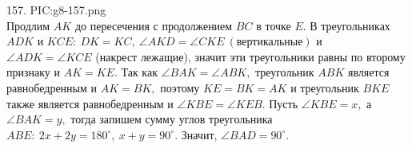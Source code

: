 157. {{PIC:g8-157.png}}\\
Продлим $AK$ до пересечения с продолжением $BC$ в точке $E.$  В треугольниках $ADK$ и $KCE:\ DK=KC,\ \angle AKD=\angle CKE\ (\text{вертикальные})$ и $\angle ADK=\angle KCE$ (накрест лежащие), значит эти треугольники равны по второму признаку и $AK=KE.$ Так как $\angle BAK=\angle ABK,$ треугольник $ABK$ является равнобедренным и $AK=BK,$ поэтому $KE=BK=AK$ и треугольник $BKE$ также является равнобедренным и  $\angle KBE=\angle KEB.$ Пусть $\angle KBE=x,$ а $\angle BAK=y,$ тогда запишем сумму углов треугольника $ABE:\ 2x+2y=180^\circ,\ x+y=90^\circ.$ Значит, $\angle BAD=90^\circ.$\\
